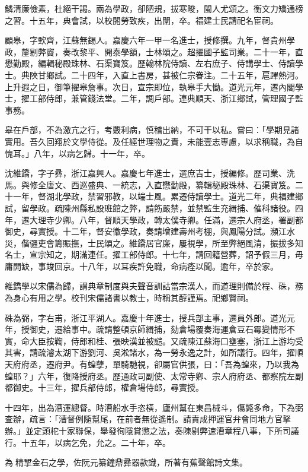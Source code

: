\begin{pinyinscope}
鱗清廉儉素，杜絕干謁。兩為學政，卻陋規，拔寒畯，閩人尤頌之。衡文力矯通榜之習。十五年，典會試，以校閱勞致疾，出闈，卒。福建士民請祀名宦祠。

顧皋，字歅齊，江蘇無錫人。嘉慶六年一甲一名進士，授修撰。九年，督貴州學政，釐剔弊竇，奏改黎平、開泰學額，士林頌之。超擢國子監司業。二十一年，直懋勤殿，編輯秘殿珠林、石渠寶笈。歷翰林院侍讀、左右庶子、侍講學士、侍讀學士。典陜甘鄉試。二十四年，入直上書房，甚被仁宗眷注。二十五年，扈蹕熱河。上升遐之日，御筆擢皋詹事。次日，宣宗即位，執皋手大慟。道光元年，遷內閣學士，擢工部侍郎，兼管錢法堂。二年，調戶部。連典順天、浙江鄉試，管理國子監事務。

皋在戶部，不為激亢之行，考覈利病，慎稽出納，不可干以私。嘗曰：「學期見諸實用。吾久回翔於文學侍從。及任經世理物之責，未能壹志專慮，以求稱職，為自愧耳。」八年，以病乞歸。十一年，卒。

沈維鐈，字子彞，浙江嘉興人。嘉慶七年進士，選庶吉士，授編修。歷司業、洗馬。與修全唐文、西巡盛典、一統志，入直懋勤殿，纂輯秘殿珠林、石渠寶笈。二十一年，督湖北學政，禁習邪教，以端士風。累遷侍讀學士。道光二年，典福建鄉試，留學政。疏陳州縣私設班館之弊，請飭嚴禁，並禁監生充緝捕、催科諸役。四年，遷大理寺少卿。八年，督順天學政，轉太僕寺卿。任滿，遷宗人府丞，署副都御史，尋實授。十二年，督安徽學政，奏請增建壽州考棚，與鳳陽分試。瀕江水災，偕疆吏會籌賑撫，士民頌之。維鐈居官廉，屢視學，所至弊絕風清，振拔多知名士，宣宗知之，期滿連任。擢工部侍郎。十七年，請回籍營葬，詔予假三月，毋庸開缺，事竣回京。十八年，以耳疾許免職，命病痊以聞。逾年，卒於家。

維鐈學以宋儒為歸，謂典章制度與夫聲音訓詁當宗漢人，而道理則備於程、硃，務為身心有用之學。校刊宋儒諸書以教士，時稱其醇謹焉。祀鄉賢祠。

硃為弼，字右甫，浙江平湖人。嘉慶十年進士，授兵部主事，遷員外郎。道光元年，授御史，遷給事中。疏請整頓京師緝捕，劾倉場覆奏海運倉豆石霉變情形不實，命大臣按鞫，侍郎和桂、張映漢並被譴。又疏陳江蘇海口壅塞，浙江上游均受其害，請疏濬太湖下游劉河、吳淞諸水，為一勞永逸之計，如所議行。四年，擢順天府府丞，遷府尹。有蝗孽，單騎馳視，卻屬官供張，曰：「吾為蝗來，乃以我為蝗耶？」六年，復降授府丞。歷通政司副使、太常寺卿、宗人府府丞、都察院左副都御史。十三年，擢兵部侍郎，權倉場侍郎，尋實授。

十四年，出為漕運總督。時漕船水手恣橫，廬州幫在東昌械斗，傷斃多命，下為弼查辦，疏言：「漕督例隨幫尾，在前者無從遙制。請責成押運官弁會同地方官拏辦。」並定頭柁十家聯保，舉發徇隱賞懲之法，奏陳剔弊速漕章程八事，下所司議行。十五年，以病乞免，允之。二十年，卒。

為精揅金石之學，佐阮元纂鐘鼎彞器款識，所著有蕉聲館詩文集。


\end{pinyinscope}
